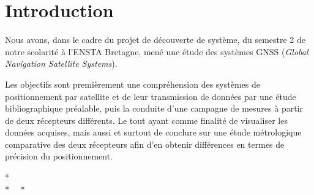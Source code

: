 \section*{Introduction}
   Nous avons, dans le cadre du projet de découverte de système, du semestre 2 de notre scolarité à l'ENSTA Bretagne, mené une étude des systèmes GNSS (\textit{Global Navigation Satellite Systems}).

   Les objectifs sont premièrement une compréhension des systèmes de positionnement par satellite et de leur transmission de données par une étude bibliographique préalable, puis la conduite d'une campagne de mesures à partir de deux récepteurs différents.
   Le tout ayant comme finalité de visualiser les données acquises, mais aussi et surtout de conclure sur une étude métrologique comparative des deux récepteurs afin d'en obtenir différences en termes de précision du positionnement.

   \vspace{3cm}
   \begin{center}
   * \\
   *  \ \ *\\
   \end{center}